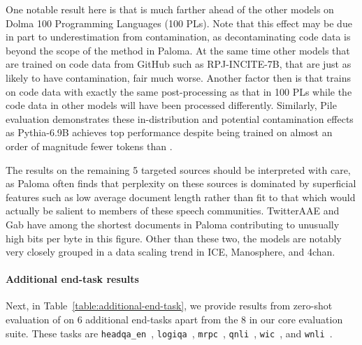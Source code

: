One notable result here is that \model is much farther ahead of the other models on Dolma 100 Programming Languages (100 PLs). Note that this effect may be due in part to underestimation from contamination, as decontaminating code data is beyond the scope of the method in Paloma. At the same time other models that are trained on code data from GitHub such as RPJ-INCITE-7B, that are just as likely to have contamination, fair much worse. Another factor then is that \model trains on code data with exactly the same post-processing as that in 100 PLs while the code data in other models will have been processed differently. Similarly, Pile evaluation demonstrates these in-distribution and potential contamination effects as Pythia-6.9B achieves top performance despite being trained on almost an order of magnitude fewer tokens than \model.

The results on the remaining 5 targeted sources should be interpreted with care, as Paloma often finds that perplexity on these sources is dominated by superficial features such as low average document length rather than fit to that which would actually be salient to members of these speech communities. TwitterAAE and Gab have among the shortest documents in Paloma contributing to unusually high bits per byte in this figure. Other than these two, the models are notably very closely grouped in a data scaling trend in ICE, Manosphere, and 4chan.

\paragraph{Additional end-task results} Next, in Table~\ref{table:additional-end-task}, we provide results from zero-shot evaluation of \model on 6 additional end-tasks apart from the 8 in our core evaluation suite. These tasks are \texttt{headqa\_en}~\citep{head-qa}, \texttt{logiqa}~\citep{logi-qa}, \texttt{mrpc}~\citep{mrpc}, \texttt{qnli}~\citep{glue}, \texttt{wic}~\citep{wic}, and \texttt{wnli}~\citep{glue}. 





